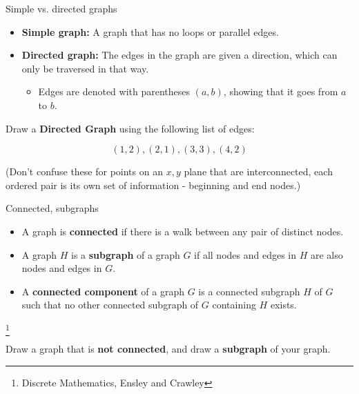     \newpage

    \begin{intro}{Simple vs. directed graphs}
        \begin{itemize}
            \item   \textbf{Simple graph:} A graph that has no loops or parallel edges.
            \item   \textbf{Directed graph:}    The edges in the graph are given a direction, which can only be traversed in that way.
                \begin{itemize}
                    \item   Edges are denoted with parentheses $(a, b)$, showing that it goes from $a$ to $b$.
                \end{itemize}
        \end{itemize}
    \end{intro}

        \begin{questionNOGRADE}{\thequestion}
            Draw a \textbf{Directed Graph} using the following list of edges:

            $$ (1,2), (2,1), (3,3), (4,2) $$

            (Don't confuse these for points on an $x,y$ plane that are interconnected,
            each ordered pair is its own set of information - beginning and end nodes.)

        \end{questionNOGRADE}

    \newpage
    
    \begin{intro}{Connected, subgraphs}
        \begin{itemize}
            \item   A graph is \textbf{connected} if there is a walk between any pair of distinct nodes.
            \item   A graph $H$ is a \textbf{subgraph} of a graph $G$ if all nodes and edges in $H$ are also
                nodes and edges in $G$.
            \item   A \textbf{connected component} of a graph $G$ is a connected subgraph $H$ of $G$ such
                that no other connected subgraph of $G$ containing $H$ exists.
        \end{itemize}
        \footnote{Discrete Mathematics, Ensley and Crawley}
    \end{intro}

        \begin{questionNOGRADE}{\thequestion}
            Draw a graph that is \textbf{not connected}, and draw a \textbf{subgraph} of your graph.
            
        \end{questionNOGRADE}
        

